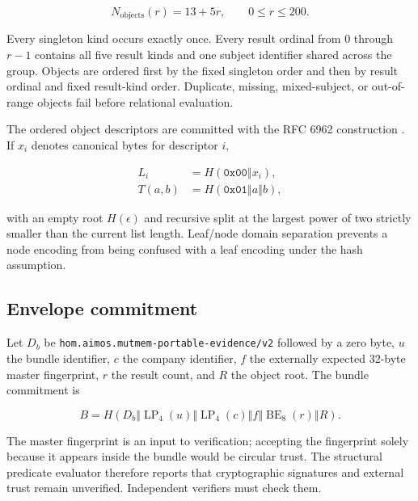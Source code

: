 \documentclass[10pt]{article}
\newcommand{\concat}{\mathbin\Vert}
\begin{document}
\begin{equation}
N_{\mathrm{objects}}(r)=13+5r, \qquad 0\le r\le 200.
\label{eq:cardinality}
\end{equation}

Every singleton kind occurs exactly once. Every result ordinal from $0$ through
$r-1$ contains all five result kinds and one subject identifier shared across
the group. Objects are ordered first by the fixed singleton order and then by
result ordinal and fixed result-kind order. Duplicate, missing, mixed-subject,
or out-of-range objects fail before relational evaluation.

The ordered object descriptors are committed with the RFC 6962 construction
\cite{rfc6962}. If $x_i$ denotes canonical bytes for descriptor $i$,

\begin{align}
L_i &= H(\texttt{0x00}\concat x_i), \\
T(a,b) &= H(\texttt{0x01}\concat a\concat b),
\label{eq:merkle}
\end{align}

with an empty root $H(\epsilon)$ and recursive split at the largest power of two
strictly smaller than the current list length. Leaf/node domain separation
prevents a node encoding from being confused with a leaf encoding under the
hash assumption.

\subsection{Envelope commitment}

Let $D_b$ be \texttt{hom.aimos.mutmem-portable-evidence/v2} followed by a zero
byte, $u$ the bundle identifier, $c$ the company identifier, $f$ the externally
expected 32-byte master fingerprint, $r$ the result count, and $R$ the object
root. The bundle commitment is

\begin{equation}
B = H\!\left(D_b\concat \operatorname{LP}_4(u)
\concat \operatorname{LP}_4(c)\concat f
\concat \operatorname{BE}_8(r)\concat R\right).
\label{eq:bundle}
\end{equation}

The master fingerprint is an input to verification; accepting the fingerprint
solely because it appears inside the bundle would be circular trust. The
structural predicate evaluator therefore reports that cryptographic signatures
and external trust remain unverified. Independent verifiers must check them.
\end{document}
